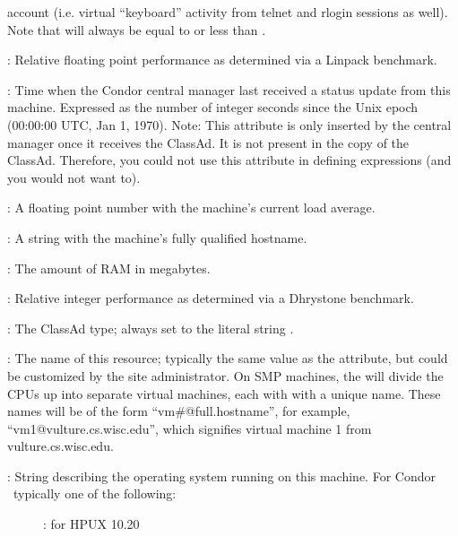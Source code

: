\begin{description}
account (i.e. virtual ``keyboard'' activity from telnet and rlogin
sessions as well).  Note that  will always be equal to or
less than .
%
\item[\AdAttr{KFlops}] : Relative floating point performance as determined via a
Linpack benchmark.
%
\item[\AdAttr{LastHeardFrom}] : Time when the Condor central manager last
received a status update from this machine.  
Expressed as 
the number of integer seconds since the Unix epoch (00:00:00 UTC, Jan 1, 1970).
Note: This attribute is only inserted by the central manager once it
receives the ClassAd.
It is not present in the  copy of the ClassAd.
Therefore, you could not use this attribute in defining 
expressions (and you would not want to).
%
\item[\AdAttr{LoadAvg}] : A floating point number with the machine's current load
average.
%
\item[\AdAttr{Machine}] : A string with the machine's fully qualified hostname.
%
\item[\AdAttr{Memory}] : The amount of RAM in megabytes.
%
\item[\AdAttr{Mips}] : Relative integer performance as determined via a Dhrystone
benchmark.
%
\item[\AdAttr{MyType}] : The ClassAd type; always set to the literal string .
%
\item[\AdAttr{Name}] : The name of this resource; typically the same value as
the  attribute, but could be customized by the site
administrator.
On SMP machines, the  will divide the CPUs up into separate
virtual machines, each with with a unique name.
These names will be of the form ``vm\#@full.hostname'', for example,
``vm1@vulture.cs.wisc.edu'', which signifies virtual machine 1 from
vulture.cs.wisc.edu. 
%
\item[\AdAttr{OpSys}] : String describing the operating system running on this
machine.  For Condor \VersionNotice\ typically one of the following:
	\begin{description}
	\item[] : for HPUX 10.20

\end{description}
\end{description}
